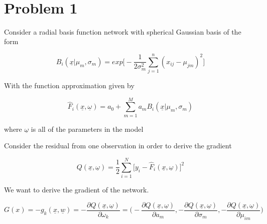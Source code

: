 \documentclass[11pt]{article}
\begin{document}
\begin{center}

\ \\
\end{center}

\section*{Problem 1}

\vspace{5 mm}
\noindent
 Consider a radial basis function network with spherical Gaussian basis of the form
 
 $$B_i(\underline{x}|\mu_m, \sigma_m) = exp\bigg[-\frac{1}{2\sigma_m^2}\sum_{j = 1}^{n}(x_{ij}-\mu_{jm})^2\bigg]$$
 
 With the function approximation given by 
 
 $$\hat{F}_i(\underline{x},\underline{\omega}) = a_0 + \sum_{m=1}^{M}a_mB_i(\underline{x}|\mu_m, \sigma_m)$$
 
 \begin{center}
 where $\underline{\omega}$ is all of the parameters in the model
 \end{center}
 
 Consider the residual from one observation in order to derive the gradient
 
 $$Q(\underline{x},\underline{\omega}) = \frac{1}{2} \sum_{i=1}^N \bigg[ y_i - \hat{F}_i(\underline{x},\underline{\omega})\bigg]^2$$
 
 We want to derive the gradient of the network. 
 
 \begin{equation}
 G(x) = -g_k(\underline{x}, \underline{w}) = - \frac{\partial Q(\underline{x}, \underline{\omega})}{\partial\omega_k} = \bigg(- \frac{\partial Q(\underline{x}, \underline{\omega})}{\partial a_m}, - \frac{\partial Q(\underline{x}, \underline{\omega})}{\partial \sigma_m}, - \frac{\partial Q(\underline{x}, \underline{\omega})}{\partial \mu_{im}}\bigg)
 \end{equation}
 
\end{document}
